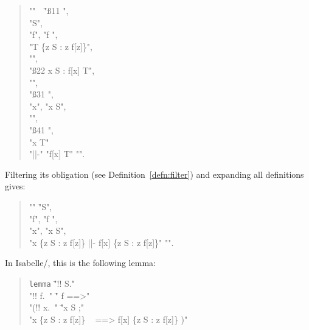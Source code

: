 \documentclass[a4paper]{easychair}
\begin{document}
\begin{quote} \small
  \begin{tabbing}
    "\smash{\Bigl(}"\ \ 
    \= "\ss11 \DEF {}", \\
    \> "\NEW S", \\
    \> "\NEW f", "f \in [S -> \SUBSET\ S]", \\
    \> "T \DEF \{z \in S : z \notin f[z]\}", \\
    \> "", \\
    \> "\ss22 \DEF \forall x \in S : f[x] \neq T", \\
    \> "", \\
    \> "\ss31 \DEF \obl{\NEW x, x \in S ||- f[x] \neq T}", \\
    \> "\NEW x", "x \in S", \\
    \> "", \\
    \> "\ss41 \DEF {}", \\
    \> "x \in T" \\
    "||-" \> "f[x] \neq T" "\smash{\Bigr)}".
  \end{tabbing}
\end{quote}
Filtering its obligation (see Definition~\ref{defn:filter}) and expanding all definitions gives:
\begin{quote} \small
  \begin{tabbing}
    "\smash{\Bigl(}"
    \= "\NEW S", \\
    \> "\NEW f", "f \in [S -> \SUBSET\ S]", \\
    \> "\NEW x", "x \in S", \\
    \> "x \in \{z \in S : z \notin f[z]\} ||- f[x] \neq \{z \in S : z \notin f[z]\}" "\smash{\Bigr)}".
  \end{tabbing}
\end{quote}
In Isabelle/\tlaplus, this is the following lemma:
\begin{quote} \small
  \begin{tabbing}
    \texttt{lemma} \= "!! S." \\
                   \> "!! f.\ " \= " f \in [S -> \SUBSET\ S] ==>" \\
                   \>                 \> "\Bigl(!! x.\ \bigl\llbracket" \= "x \in S ;" \\
                   \> \> \> "x \in \{z \in S : z \notin f[z]\} \ \bigr\rrbracket
                         ==> f[x] \neq \{z \in S : z \notin f[z]\} \Bigr)"
  \end{tabbing}
\end{quote}
\end{document}
